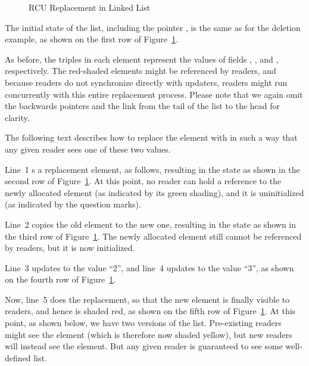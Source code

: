 \begin{figure}[tbp]
\begin{center}
\end{center}
\caption{RCU Replacement in Linked List}
\label{fig:defer:RCU Replacement in Linked List}
\end{figure}

The initial state of the list, including the pointer ,
is the same as for the deletion example, as shown on the
first row of
Figure~\ref{fig:defer:RCU Replacement in Linked List}.

As before,
the triples in each element represent the values of fields ,
, and , respectively.
The red-shaded elements might be referenced by readers,
and because readers do not synchronize directly with updaters,
readers might run concurrently with this entire replacement process.
Please note that
we again omit the backwards pointers and the link from the tail
of the list to the head for clarity.

The following text describes how to replace the  element
with  in such a way that any given reader sees one of these
two values.

Line~1 s a replacement element, as follows,
resulting in the state as shown in the second row of
Figure~\ref{fig:defer:RCU Replacement in Linked List}.
At this point, no reader can hold a reference to the newly allocated
element (as indicated by its green shading), and it is uninitialized
(as indicated by the question marks).

Line~2 copies the old element to the new one, resulting in the
state as shown in the third row of
Figure~\ref{fig:defer:RCU Replacement in Linked List}.
The newly allocated element still cannot be referenced by readers, but
it is now initialized.

Line~3 updates  to the value ``2'', and
line~4 updates  to the value ``3'', as shown on the fourth row of
Figure~\ref{fig:defer:RCU Replacement in Linked List}.

Now, line~5 does the replacement, so that the new element is
finally visible to readers, and hence is shaded red, as shown on
the fifth row of
Figure~\ref{fig:defer:RCU Replacement in Linked List}.
At this point, as shown below, we have two versions of the list.
Pre-existing readers might see the  element (which is
therefore now shaded yellow), but
new readers will instead see the  element.
But any given reader is guaranteed to see some well-defined list.

